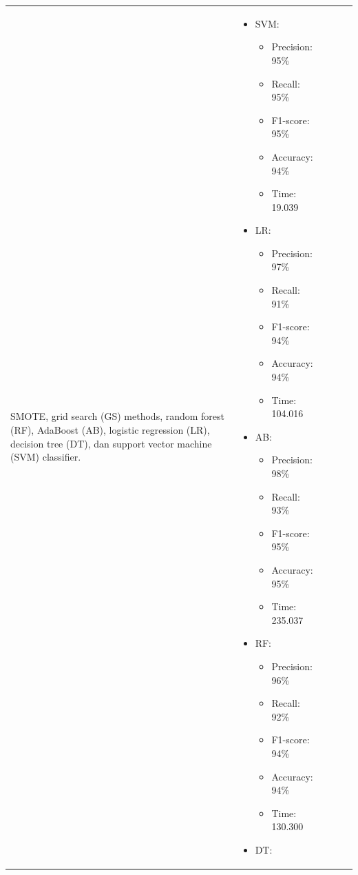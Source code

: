 \begin{longtable}{|p{}|p{}|p{}|p{}|p{}|}
 SMOTE, grid search (GS) methods, random forest (RF), AdaBoost (AB), logistic regression (LR), decision tree (DT), dan support vector machine (SVM) classifier. &
 \begin{itemize}[leftmargin=*] %
    \item SVM:
    \begin{itemize}[leftmargin=*] %
        \item Precision: 95\%
        \item Recall: 95\%
        \item F1-score: 95\%
        \item Accuracy: 94\%
        \item Time: 19.039
    \end{itemize}
    \item LR:
    \begin{itemize}[leftmargin=*] %
        \item Precision: 97\%
        \item Recall: 91\%
        \item F1-score: 94\%
        \item Accuracy: 94\%
        \item Time: 104.016
    \end{itemize}
    \item AB:
    \begin{itemize}[leftmargin=*] %
        \item Precision: 98\%
        \item Recall: 93\%
        \item F1-score: 95\%
        \item Accuracy: 95\%
        \item Time: 235.037
    \end{itemize}
    \item RF:
    \begin{itemize}[leftmargin=*] %
        \item Precision: 96\%
        \item Recall: 92\%
        \item F1-score: 94\%
        \item Accuracy: 94\%
        \item Time: 130.300
    \end{itemize}
    \item DT:
    \begin{itemize}[leftmargin=*] %

\end{itemize}
\end{itemize}
\end{longtable}
